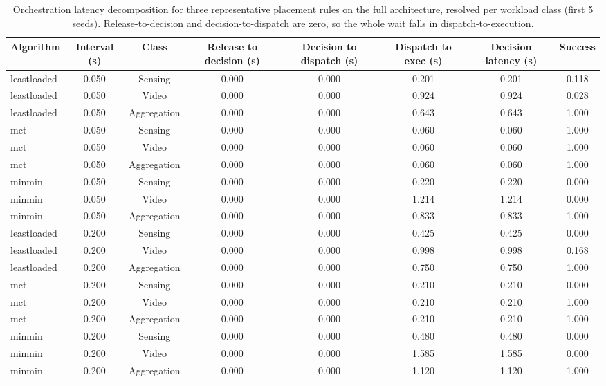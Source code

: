 \begin{table}
\centering
\footnotesize
\caption{Orchestration latency decomposition for three representative placement rules on the full architecture, resolved per workload class (first 5 seeds). Release-to-decision and decision-to-dispatch are zero, so the whole wait falls in dispatch-to-execution.}
\label{tab:p1-latency}
\begin{tabular}{lccccccc}
\toprule
Algorithm & Interval (s) & Class & Release to decision (s) & Decision to dispatch (s) & Dispatch to exec (s) & Decision latency (s) & Success \\
\midrule
leastloaded & 0.050 & Sensing & 0.000 & 0.000 & 0.201 & 0.201 & 0.118 \\
leastloaded & 0.050 & Video & 0.000 & 0.000 & 0.924 & 0.924 & 0.028 \\
leastloaded & 0.050 & Aggregation & 0.000 & 0.000 & 0.643 & 0.643 & 1.000 \\
mct & 0.050 & Sensing & 0.000 & 0.000 & 0.060 & 0.060 & 1.000 \\
mct & 0.050 & Video & 0.000 & 0.000 & 0.060 & 0.060 & 1.000 \\
mct & 0.050 & Aggregation & 0.000 & 0.000 & 0.060 & 0.060 & 1.000 \\
minmin & 0.050 & Sensing & 0.000 & 0.000 & 0.220 & 0.220 & 0.000 \\
minmin & 0.050 & Video & 0.000 & 0.000 & 1.214 & 1.214 & 0.000 \\
minmin & 0.050 & Aggregation & 0.000 & 0.000 & 0.833 & 0.833 & 1.000 \\
leastloaded & 0.200 & Sensing & 0.000 & 0.000 & 0.425 & 0.425 & 0.000 \\
leastloaded & 0.200 & Video & 0.000 & 0.000 & 0.998 & 0.998 & 0.168 \\
leastloaded & 0.200 & Aggregation & 0.000 & 0.000 & 0.750 & 0.750 & 1.000 \\
mct & 0.200 & Sensing & 0.000 & 0.000 & 0.210 & 0.210 & 0.000 \\
mct & 0.200 & Video & 0.000 & 0.000 & 0.210 & 0.210 & 1.000 \\
mct & 0.200 & Aggregation & 0.000 & 0.000 & 0.210 & 0.210 & 1.000 \\
minmin & 0.200 & Sensing & 0.000 & 0.000 & 0.480 & 0.480 & 0.000 \\
minmin & 0.200 & Video & 0.000 & 0.000 & 1.585 & 1.585 & 0.000 \\
minmin & 0.200 & Aggregation & 0.000 & 0.000 & 1.120 & 1.120 & 1.000 \\

\end{tabular}
\end{table}
